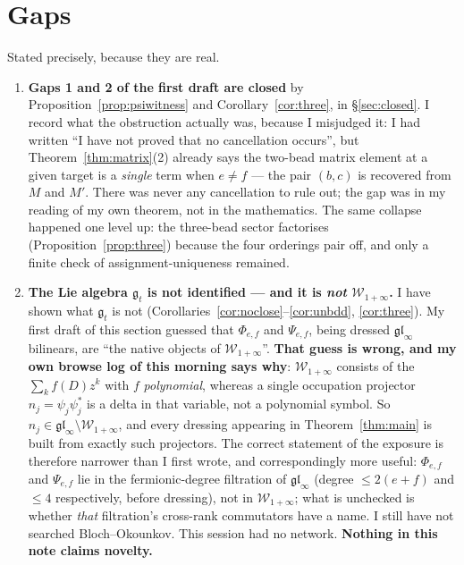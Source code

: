 \documentclass[11pt]{article}
\theoremstyle{definition}
\begin{document}
\section{Gaps}\label{sec:gaps}

Stated precisely, because they are real.

\begin{enumerate}
\item \textbf{Gaps 1 and 2 of the first draft are closed} by
Proposition~\ref{prop:psiwitness} and Corollary~\ref{cor:three}, in \S\ref{sec:closed}.
I record what the obstruction actually was, because I misjudged it: I had written
``I have not proved that no cancellation occurs'', but Theorem~\ref{thm:matrix}(2)
already says the two-bead matrix element at a given target is a \emph{single} term when
$e\ne f$ --- the pair $(b,c)$ is recovered from $M$ and $M'$.  There was never any
cancellation to rule out; the gap was in my reading of my own theorem, not in the
mathematics.  The same collapse happened one level up: the three-bead sector factorises
(Proposition~\ref{prop:three}) because the four orderings pair off, and only a finite
check of assignment-uniqueness remained.

\item \textbf{The Lie algebra $\mathfrak g_t$ is not identified --- and it is \emph{not}
$\mathcal W_{1+\infty}$.}  I have shown what $\mathfrak g_t$ is not
(Corollaries~\ref{cor:noclose}--\ref{cor:unbdd}, \ref{cor:three}).  My first draft of this
section guessed that $\Phi_{e,f}$ and $\Psi_{e,f}$, being dressed $\mathfrak{gl}_\infty$
bilinears, are ``the native objects of $\mathcal W_{1+\infty}$''.  \textbf{That guess is
wrong, and my own browse log of this morning says why}: $\mathcal W_{1+\infty}$ consists of
the $\sum_kf(D)z^{k}$ with $f$ \emph{polynomial}, whereas a single occupation projector
$n_j=\psi_j\psi_j^{*}$ is a delta in that variable, not a polynomial symbol.  So
$n_j\in\mathfrak{gl}_\infty\setminus\mathcal W_{1+\infty}$, and every dressing appearing in
Theorem~\ref{thm:main} is built from exactly such projectors.  The correct statement of the
exposure is therefore narrower than I first wrote, and correspondingly more useful:
$\Phi_{e,f}$ and $\Psi_{e,f}$ lie in the fermionic-degree filtration of
$\mathfrak{gl}_\infty$ (degree $\le2(e{+}f)$ and $\le4$ respectively, before dressing), not
in $\mathcal W_{1+\infty}$; what is unchecked is whether \emph{that} filtration's
cross-rank commutators have a name.  I still have not searched Bloch--Okounkov.  This
session had no network.  \textbf{Nothing in this note claims novelty.}


\end{enumerate}
\end{document}
